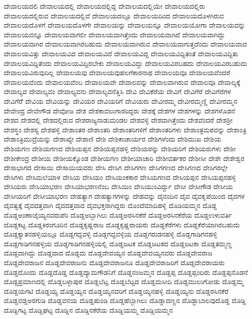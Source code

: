 {ದೇವಾಲಯದಲಿ
ದೇವಾಲಯದಲ್ಲಿ
ದೇವಾಲಯದಲ್ಲಿದ್ದ
ದೇವಾಲಯದಲ್ಲಿಯೇ
ದೇವಾಲಯದಲ್ಲಿರು
ದೇವಾಲಯದಲ್ಲಿರುವ
ದೇವಾಲಯದಲ್ಲಿವೆ
ದೇವಾಲಯದಲ್ಲೂ
ದೇವಾಲಯದಿಂದ
ದೇವಾಲಯದೊಳಗಿರುವ
ದೇವಾಲಯದೊಳಗೆ
ದೇವಾಲಯದೊಳಗೇ
ದೇವಾಲಯನ್ನು
ದೇವಾಲಯನ್ನೂ
ದೇವಾಲಯಯೋಗಾ
ದೇವಾಲಯವನ್ನು
ದೇವಾಲಯವನ್ನೂ
ದೇವಾಲಯವಾಗಲೀ
ದೇವಾಲಯವಾಗಿತ್ತೆಂದು
ದೇವಾಲಯವಾಗಿದೆ
ದೇವಾಲಯವಾಗಿದ್ದು
ದೇವಾಲಯವಾಗಿರ
ದೇವಾಲಯವಾಗಿರಬಹುದು
ದೇವಾಲಯವಾಗಿರುವ
ದೇವಾಲಯವಾಗುತ್ತದೆಂದು
ದೇವಾಲಯವಾದ
ದೇವಾಲಯವಿತ್ತು
ದೇವಾಲಯವಿದ
ದೇವಾಲಯವಿದೆ
ದೇವಾಲಯವಿದ್ದ
ದೇವಾಲಯವಿದ್ದಿತಂತೆ
ದೇವಾಲಯವಿದ್ದಿತು
ದೇವಾಲಯವಿದ್ದಿತೆಂದು
ದೇವಾಲಯವಿದ್ದಿರಬೇಕು
ದೇವಾಲಯವಿದ್ದು
ದೇವಾಲಯವಿರಬಹದು
ದೇವಾಲಯವಿರಬಹುದು
ದೇವಾಲಯವಿರುವುದಿಲ್ಲ
ದೇವಾಲಯವು
ದೇವಾಲಯವುಹಲಗೆಕಾರನಾಥ
ದೇವಾಲಯವೂ
ದೇವಾಲಯವೆಂದರೆ
ದೇವಾಲಯವೆಂದು
ದೇವಾಲಯವೆಂಬ
ದೇವಾಲಯವೇ
ದೇವಾಲವನ್ನು
ದೇವಾಲವಾಗಿರುವ
ದೇವಾಲವೂ
ದೇವಾಲ್ಯಕ್ಕೆ
ದೇವಾಲ್ಯವ
ದೇವಾಲ್ಯವಂ
ದೇವಾಲ್ಯವನು
ದೇವಾಲ್ಯವನೆತ್ತಿಸಿ
ದೇವಿ
ದೇವಿಕೆರೆಯ
ದೇವಿಗೆ
ದೇವಿಗೆರೆ
ದೇವಿಗೆರೆಗಳ
ದೇವಿಗೆರೆೆ
ದೇವಿಯ
ದೇವಿಯನ್ನು
ದೇವಿಯರ
ದೇವಿಯರಿಗೆ
ದೇವಿಯರು
ದೇವೀರಮ್ಮ
ದೇವೀರಮ್ಮಣ್ಣಿ
ದೇವೀರಮ್ಮನ
ದೇವೇಂದ್ರ
ದೇವೇಗೌಡ
ದೇವೋಜ
ದೇಶ
ದೇಶಕಾವಲುಗಾರರಿದ್ದರು
ದೇಶಕ್ಕೆ
ದೇಶಗಳ
ದೇಶಗಳನ್ನು
ದೇಶಗಳೊಡನೆ
ದೇಶದ
ದೇಶದಲ್ಲಿ
ದೇಶದಲ್ಲಿರುವ
ದೇಶರಾಜ್ಯನಾಡುಮಂಡಲ
ದೇಶವಳ್ಳಿ
ದೇಶವಾಗಿತ್ತೆಂದು
ದೇಶವೆಂದರೆ
ದೇಶಶ್ರೀ
ದೇಶಸ್ಥಂ
ದೇಶಸ್ಯ
ದೇಶಹಳ್ಳಿ
ದೇಶಾಂತರ
ದೇಶಾಂತರಿ
ದೇಶಾಂತರಿಗಳಿಗೆ
ದೇಶಾಂತರಿಗಳು
ದೇಶಾಂತ್ರಮಠವನ್ನು
ದೇಶಾಂತ್ರಿ
ದೇಶಾಂತ್ರಿಮುದ್ರೆಯನ್ನು
ದೇಶಾಖ್ಯೇ
ದೇಶಾಣಿ
ದೇಶಿ
ದೇಶಿಕಾಚಾರ್ಯರ
ದೇಶಿಗಳೆಂದು
ದೇಶಿಮುಖ
ದೇಶಿಯ
ದೇಶಿಯಗಣ
ದೇಶಿಯಗಣದ
ದೇಶಿಯಪ್ಪನ
ದೇಶಿಯಪ್ಪನಹಳ್ಳಿ
ದೇಶಿಯರನ್ನು
ದೇಶಿಯರಿಗೆ
ದೇಶಿಯರುಗಳು
ದೇಶೀ
ದೇಶೀಕೇಂದ್ರ
ದೇಶೀಯ
ದೇಶೀಯಕ್ಕೊಂಡ
ದೇಶೀಯಗಣ
ದೇಶೀಯಾಚಾರಿ
ದೇಶೀವರ್ತಕರ
ದೇಶೀಸೀ
ದೇಶೇ
ದೇಶೇಶ್ವರ
ದೇಸಾಭಾಗದ
ದೇಸಾಯಿ
ದೇಸಾಯಿಯವರು
ದೇಸಿ
ದೇಸಿಗ
ದೇಸಿಗಗಣ
ದೇಸಿಗಗಣದ
ದೇಸಿಗಣದ
ದೇಸಿಗರಲ್ಲೇ
ದೇಸಿಗಳು
ದೇಸಿಮಲೆಯಾಳ
ದೇಸಿಯ
ದೇಸಿಯಂ
ದೇಸಿಯಂಕಕಾರ
ದೇಸಿಯಗಣದ
ದೇಸಿಯಪ್ಪನ
ದೇಸಿಯಪ್ಪನಹಳ್ಳಿ
ದೇಸಿಯರು
ದೇಸಿಯಾಭರಣ
ದೇಸಿಯಾಭರಣನೆಂಬ
ದೇಸಿಯಿಂ
ದೇಸಿಯುಂವಿರ್ದ್ದು
ದೇಸೀ
ದೇಸೀಗೌಡ
ದೇಸೀಯ
ದೇಸೀಯರಿಗೆ
ದೇಸೀಯಾಭರಣ
ದೇಹತ್ಯಾಗ
ದೇಹತ್ಯಾಗಗಳನ್ನು
ದೇಹವನ್ನು
ದೈನಂದಿನ
ದೈವ
ದೈವಕೃಪೆಯಿಂದ
ದೈವಗಳ
ದೈವತ್ವಕ್ಕೆ
ದೈವದತ್ತವಾಗಿ
ದೈವದತ್ತವಾದ
ದೈವಭಕ್ತರಾಗಿದ್ದರು
ದೊಂದೆಮಾದಿಹಳ್ಳಿ
ದೊಡಿಯಮ್ಮನ
ದೊಡ್ಡ
ದೊಡ್ಡಅಂಣಾಜೈಯ್ಯನವರುಪೆರಿ
ದೊಡ್ಡಅಬ್ಬಾಗಿಲು
ದೊಡ್ಡಅರಸಿನಕೆರೆ
ದೊಡ್ಡಅರಸಿನಕೆರೆಯ
ದೊಡ್ಡಉಳುವರ್ತಿ
ದೊಡ್ಡಕಟ್ಟ
ದೊಡ್ಡಕಿರಂಗೂರಿನ
ದೊಡ್ಡಕೃಷ್ಣರಾಜ
ದೊಡ್ಡಕೃಷ್ಣರಾಯರು
ದೊಡ್ಡಕೆರೆಗಳು
ದೊಡ್ಡಕೆರೆಯಾಗಿರಬಹುದು
ದೊಡ್ಡಕ್ಯಾತನಹಳ್ಳಿಯಲ್ಲೂ
ದೊಡ್ಡಗದ್ದವಳ್ಳಿ
ದೊಡ್ಡಗದ್ದವಳ್ಳಿಯ
ದೊಡ್ಡಗರುಡನಹಳ್ಳಿ
ದೊಡ್ಡಗಾಡಿಗನಹಳ್ಳಿ
ದೊಡ್ಡಗಾಡಿಗನಹಳ್ಳಿಯ
ದೊಡ್ಡಗಾಡಿಗನಹಳ್ಳಿಯಲ್ಲಿ
ದೊಡ್ಡಜಟಕ
ದೊಡ್ಡಜಟಕದ
ದೊಡ್ಡಜಟಕಾ
ದೊಡ್ಡತಮ್ಮಣ್ಣ
ದೊಡ್ಡದಾಗಿದ್ದು
ದೊಡ್ಡದಾದ
ದೊಡ್ಡದು
ದೊಡ್ಡದೇವಯ್ಯನ
ದೊಡ್ಡದೇವಯ್ಯನವರು
ದೊಡ್ಡದೇವರಾಜ
ದೊಡ್ಡದೇವರಾಜನ
ದೊಡ್ಡದೇವರಾಜನು
ದೊಡ್ಡದೇವರಾಜನೂ
ದೊಡ್ಡದೇವರಾಜರಿಗೆ
ದೊಡ್ಡದೇವರಾಯರು
ದೊಡ್ಡದೊಂದು
ದೊಡ್ಡದೊಡ್ಡ
ದೊಡ್ಡದ್ಯಾಮಗೌಡನಿಗೆ
ದೊಡ್ಡನಂಜಮ್ಮನ
ದೊಡ್ಡಪ್ಪ
ದೊಡ್ಡಪ್ಪಂದಿರು
ದೊಡ್ಡಪ್ಪನೊಡನೆ
ದೊಡ್ಡಪ್ರಮಾಣದಲ್ಲಿ
ದೊಡ್ಡಬಳ್ಳಾಪುರ
ದೊಡ್ಡಬೆಟ್ಟ
ದೊಡ್ಡಬೆಟ್ಟದ
ದೊಡ್ಡಮಸೀದಿ
ದೊಡ್ಡಮುಲುಗೋಡು
ದೊಡ್ಡಮ್ಮ
ದೊಡ್ಡಯಗಟಿ
ದೊಡ್ಡಯ್ಯ
ದೊಡ್ಡಯ್ಯನ
ದೊಡ್ಡಯ್ಯನವರಿಗೆ
ದೊಡ್ಡಯ್ಯನಹಳ್ಳಿ
ದೊಡ್ಡಯ್ಯನು
ದೊಡ್ಡರಸಿನಕೆರೆ
ದೊಡ್ಡವಡ್ಡಅರಗುಡಿ
ದೊಡ್ಡವನಯ
ದೊಡ್ಡಹುಂಡಿ
ದೊಡ್ಡಹೆಬ್ಬಾಗಿಲು
ದೊಡ್ಡಾದಣ್ಣನ
ದೊಡ್ಡಾಬಾಲವುದೊಡ್ಡ
ದೊಡ್ಡಿ
ದೊಡ್ಡಿಗಟ್ಟ
ದೊಡ್ಡಿಘಟ್ಟ
ದೊಡ್ಡಿನ
ದೊಡ್ಡಿನಕೆರೆಯ
ದೊಡ್ಡಿಯಮ್ಮ
ದೊಡ್ಡಿಯಮ್ಮನ
}
